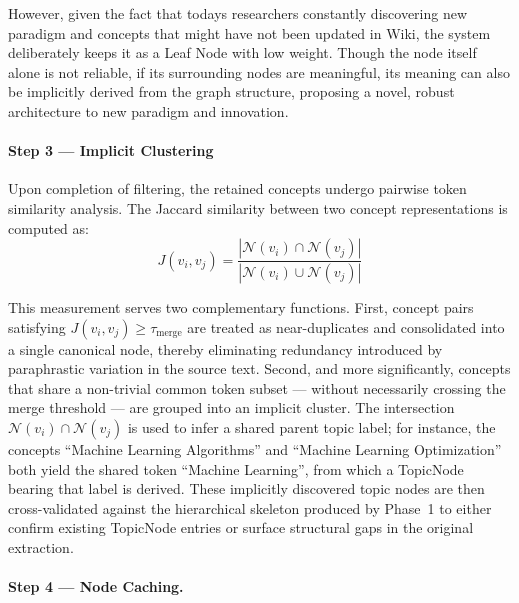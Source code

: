  However, given the fact that todays researchers constantly discovering new paradigm and concepts that might have not been updated in Wiki, the system deliberately keeps 
 it as a Leaf Node with low weight. Though the node itself alone is not reliable, if its surrounding nodes are meaningful, its meaning can also be implicitly derived from 
 the graph structure, proposing a novel, robust architecture to new paradigm and innovation.
\paragraph*{Step 3 — Implicit Clustering}

Upon completion of filtering, the retained concepts undergo pairwise token similarity analysis. The Jaccard similarity between two concept representations is 
computed as:
\begin{equation}
    J(v_i, v_j) = \frac{|\mathcal{N}(v_i) \cap \mathcal{N}(v_j)|}{|\mathcal{N}(v_i) \cup \mathcal{N}(v_j)|}
\end{equation}

This measurement serves two complementary functions. First, concept pairs satisfying $J(v_i, v_j) \geq \tau_{\text{merge}}$ are treated as near-duplicates and 
consolidated into a single canonical node, thereby eliminating redundancy introduced by paraphrastic variation in the source text. Second, and more significantly, 
concepts that share a non-trivial common token subset — without necessarily crossing the merge threshold — are grouped into an  {implicit cluster}. The intersection 
$\mathcal{N}(v_i) \cap \mathcal{N}(v_j)$ is used to infer a shared parent topic label; for instance, the concepts ``Machine Learning Algorithms'' and ``Machine Learning Optimization'' 
both yield the shared token ``Machine Learning'', from which a  {TopicNode} bearing that label is derived. These implicitly discovered topic nodes are then cross-validated 
against the hierarchical skeleton produced by Phase~1 to either confirm existing  {TopicNode} entries or surface structural gaps in the original extraction.

\paragraph*{Step 4 — Node Caching.}

